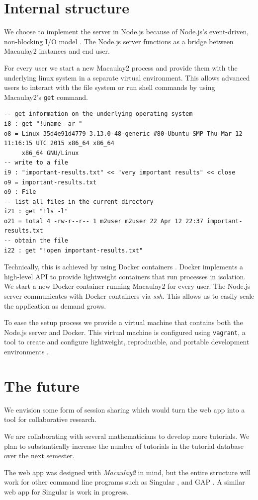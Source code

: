 \documentclass[twocolumn]{article}
\def\M2{{\it Macaulay2}}
\begin{document}
\section{Internal structure}

We choose to implement the server in Node.js
because of Node.js's event-driven, non-blocking I/O model \cite{nodejs}.
The Node.js server functions as a bridge between Macaulay2 instances and end user.

For every user we start a new Macaulay2 process and
provide them with the underlying linux system in a separate virtual environment.
This allows advanced users to
interact with the file system or run shell commands by using Macaulay2's {\tt get} command.

\begin{lstlisting}[breaklines]
-- get information on the underlying operating system
i8 : get "!uname -ar "
o8 = Linux 35d4e91d4779 3.13.0-48-generic #80-Ubuntu SMP Thu Mar 12 11:16:15 UTC 2015 x86_64 x86_64
     x86_64 GNU/Linux
-- write to a file     
i9 : "important-results.txt" << "very important results" << close
o9 = important-results.txt
o9 : File
-- list all files in the current directory
i21 : get "!ls -l"
o21 = total 4 -rw-r--r-- 1 m2user m2user 22 Apr 12 22:37 important-results.txt
-- obtain the file
i22 : get "!open important-results.txt"
\end{lstlisting}

Technically, this is achieved by using Docker containers \cite{docker}. Docker implements
a high-level API to provide lightweight containers that run processes in isolation.
We start a new Docker container running Macaulay2 for every user. The Node.js
server communicates with Docker containers via {\it ssh}. This allows us to easily
scale the application as demand grows.

To ease the setup process we provide a virtual machine that contains both the Node.js server
and Docker. This virtual machine is configured using {\tt vagrant}, a tool to create and
configure lightweight, reproducible, and portable development environments \cite{vagrant}.

\section{The future}

We envision some form of session sharing which would turn the web app into a tool for collaborative research.

We are collaborating with several mathematicians to develop more tutorials.
We plan to substantically increase the number of tutorials in the tutorial database over the next semester.

The web app was designed with \M2 in mind, but
the entire structure will work for other command line programs such as Singular \cite{singular},
and GAP \cite{GAP4}. A similar web app for Singular is work in progress.




\end{document}
